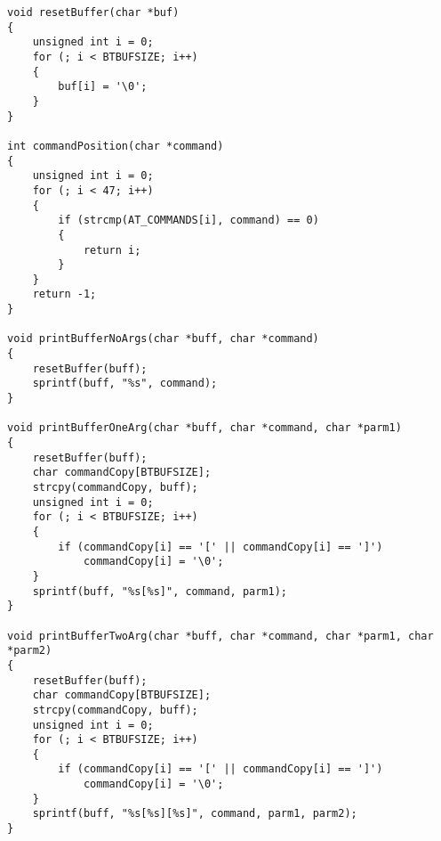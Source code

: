 \begin{code}
\begin{verbatim}
void resetBuffer(char *buf)
{
    unsigned int i = 0;
    for (; i < BTBUFSIZE; i++)
    {
        buf[i] = '\0';
    }
}

int commandPosition(char *command)
{
    unsigned int i = 0;
    for (; i < 47; i++)
    {
        if (strcmp(AT_COMMANDS[i], command) == 0)
        {
            return i;
        }
    }
    return -1;
}

void printBufferNoArgs(char *buff, char *command)
{
    resetBuffer(buff);
    sprintf(buff, "%s", command);
}

void printBufferOneArg(char *buff, char *command, char *parm1)
{
    resetBuffer(buff);
    char commandCopy[BTBUFSIZE];
    strcpy(commandCopy, buff);
    unsigned int i = 0;
    for (; i < BTBUFSIZE; i++)
    {
        if (commandCopy[i] == '[' || commandCopy[i] == ']')
            commandCopy[i] = '\0';
    }
    sprintf(buff, "%s[%s]", command, parm1);
}

void printBufferTwoArg(char *buff, char *command, char *parm1, char *parm2)
{
    resetBuffer(buff);
    char commandCopy[BTBUFSIZE];
    strcpy(commandCopy, buff);
    unsigned int i = 0;
    for (; i < BTBUFSIZE; i++)
    {
        if (commandCopy[i] == '[' || commandCopy[i] == ']')
            commandCopy[i] = '\0';
    }
    sprintf(buff, "%s[%s][%s]", command, parm1, parm2);
}


\end{verbatim}
\end{code}
